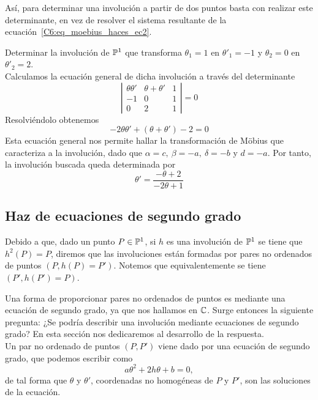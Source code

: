 Así, para determinar una involución a partir de dos puntos basta con realizar este determinante, en vez de resolver el sistema resultante de la ecuación~\eqref{C6:eq_moebius_haces_ec2}.
\begin{exa}
	Determinar la involución de $\mathbb{P}^1$ que transforma $\theta_1=1$ en $\theta'_1=-1$ y $\theta_2=0$ en $\theta'_2=2$.\\
	
	Calculamos la ecuación general de dicha involución a través del determinante
	\begin{equation*}
		\left| \begin{array}{ccc}
			\theta\theta'&\theta+\theta'&1\\
			-1&0&1\\
			0&2&1
		\end{array}\right| =0
	\end{equation*}
	Resolviéndolo obtenemos
	\begin{equation*}
		-2\theta\theta'+(\theta+\theta')-2=0
	\end{equation*}
	Esta ecuación general nos permite hallar la transformación de Möbius que caracteriza a la involución, dado que $\alpha=c, \ \beta=-a, \ \delta=-b$ y $d=-a$. Por tanto, la involución buscada queda determinada por
	\begin{equation*}
		\theta'=\frac{-\theta+2}{-2\theta+1}
	\end{equation*}
\end{exa}

\subsection{Haz de ecuaciones de segundo grado}
Debido a que, dado un punto $P\in\mathbb{P}^1$, si $h$ es una involución de $\mathbb{P}^1$ se tiene que $h^2(P)=P$, diremos que las involuciones están formadas por pares no ordenados de puntos $(P,h(P)=P')$. Notemos que equivalentemente se tiene $(P',h(P')=P)$.

Una forma de proporcionar pares no ordenados de puntos es mediante una ecuación de segundo grado, ya que nos hallamos en $\mathbb{C}$. Surge entonces la siguiente pregunta: ¿Se podría describir una involución mediante ecuaciones de segundo grado? En esta sección nos dedicaremos al desarrollo de la respuesta.\\

Un par no ordenado de puntos $(P,P')$ viene dado por una ecuación de segundo grado, que podemos escribir como
\begin{equation*}
	a\theta^2+2h\theta+b=0,
\end{equation*}
de tal forma que $\theta$ y $\theta'$, coordenadas no homogéneas de $P$ y $P'$, son las soluciones de la ecuación.

